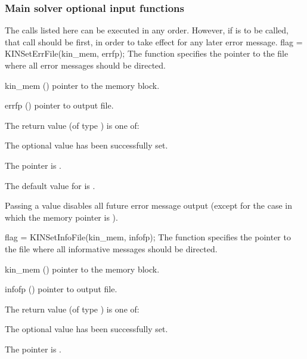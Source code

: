 \subsubsection{Main solver optional input functions}
The calls listed here can be executed in any order. However, if  
is to be called, that call should be first, in order to take effect for any later 
error message.
{
flag = KINSetErrFile(kin\_mem, errfp);
}
{
  The function  specifies the pointer to the file
  where all {\kinsol} error messages should be directed.
}
{
  \begin{args}
  \item[kin\_mem] ()
    pointer to the {\kinsol} memory block.
  \item[errfp] ()
    pointer to output file.
  \end{args}
}
{
  The return value  (of type ) is one of:
  \begin{args}
  \item[\Id{KIN\_SUCCESS}] 
    The optional value has been successfully set.
  \item[\Id{KIN\_MEM\_NULL}]
    The  pointer is .
  \end{args}
}
{
  The default value for  is .

  Passing a value  disables all future error message output
  (except for the case in which the {\kinsol} memory pointer is ).
}
{
flag = KINSetInfoFile(kin\_mem, infofp);
}
{
  The function  specifies the pointer to the file
  where all informative messages should be directed.
}
{
  \begin{args}
  \item[kin\_mem] ()
    pointer to the {\kinsol} memory block.
  \item[infofp] ()
    pointer to output file.
  \end{args}
}
{
  The return value  (of type ) is one of:
  \begin{args}
  \item[\Id{KIN\_SUCCESS}] 
    The optional value has been successfully set.
  \item[\Id{KIN\_MEM\_NULL}]
    The  pointer is .
  \end{args}
}
